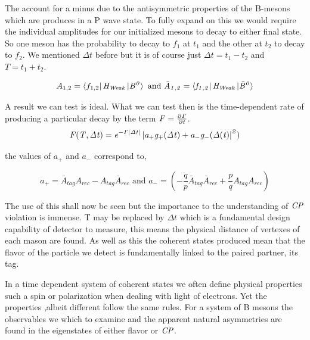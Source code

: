 \documentclass[floatfix,aps,prd,amsmath,amssymb]{revtex4}
\begin{document}
The account for a minus due to the antisymmetric properties of the B-mesons which are produces in a P wave state. To fully expand on this we would require the individual amplitudes for our initialized mesons to decay to either final state. So one meson has the probability to decay to $f_1$ at $t_1$ and the other at $t_2$ to decay to $f_2$. We mentioned $\Delta t$ before but it is of course just $\Delta t = t_1 -t_2$ and $T= t_1 +t_2$.

\[A_{1,2}=\bra{f_{1,2}}\it{H_{Weak}}\ket{B^{0}} \mbox{ and } \bar{A}_{1,2}=\bra{f_{1,2}}\it{H_{Weak}}\ket{\bar{B}^{0}}\]

A result we can test is ideal. What we can test then is the time-dependent rate of producing a particular decay by the term $\it{F}=\frac{\partial\Gamma}{\partial t}$. 
\[\it{F}(T,\Delta t)=e^{-\Gamma\left|\Delta t\right|}\left| a_{+}g_{+}(\Delta t)+ a_{-}g_{-}(\Delta (t) \right|^{2})\]

the values of $a_+$ and $a_-$ correspond to,

\[ a_{+}=\bar{A}_{tag}A_{rec}-A_{tag}\bar{A}_{rec} \mbox{ and }a_{-}=\left(-\frac{q}{p}\bar{A}_{tag}\bar{A}_{rec}+\frac{p}{q}A_{tag}A_{rec}\right)\]

The use of this shall now be seen but the importance to the understanding of $\it{CP}$ violation is immense. T may be replaced by $\Delta t$ which is a fundamental design capability of detector to measure, this means the physical distance of vertexes of each mason are found. As well as this the coherent states produced mean that the flavor of the particle we detect is fundamentally linked to the paired partner, its tag.

In a time dependent system of coherent states we often define physical properties such a spin or polarization when dealing with light of electrons. Yet the properties ,albeit different follow the same rules. For a system of B mesons the observables we which to examine and the apparent natural asymmetries are found in the eigenstates of either flavor or $\it{CP}$. 
\end{document}
